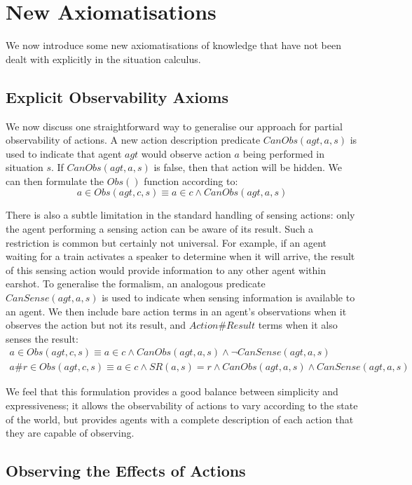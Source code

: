 \section{New Axiomatisations}

We now introduce some new axiomatisations of knowledge that have not
been dealt with explicitly in the situation calculus.


\subsection{Explicit Observability Axioms}

We now discuss one straightforward way to generalise our approach
for partial observability of actions. A new action description predicate
$CanObs(agt,a,s)$ is used to indicate that agent $agt$ would observe
action $a$ being performed in situation $s$. If $CanObs(agt,a,s)$
is false, then that action will be hidden. We can then formulate the
$Obs()$ function according to:\[
a\in Obs(agt,c,s)\equiv a\in c\wedge CanObs(agt,a,s)\]


There is also a subtle limitation in the standard handling of sensing
actions: only the agent performing a sensing action can be aware of
its result. Such a restriction is common but certainly not universal.
For example, if an agent waiting for a train activates a speaker to
determine when it will arrive, the result of this sensing action would
provide information to any other agent within earshot. To generalise
the formalism, an analogous predicate $CanSense(agt,a,s)$ is used
to indicate when sensing information is available to an agent. We
then include bare action terms in an agent's observations when it
observes the action but not its result, and \emph{$Action\#Result$}
terms when it also senses the result:\begin{gather*}
a\in Obs(agt,c,s)\equiv a\in c\wedge CanObs(agt,a,s)\wedge\neg CanSense(agt,a,s)\\
a\#r\in Obs(agt,c,s)\equiv a\in c\wedge SR(a,s)=r\wedge CanObs(agt,a,s)\wedge CanSense(agt,a,s)\end{gather*}


We feel that this formulation provides a good balance between simplicity
and expressiveness; it allows the observability of actions to vary
according to the state of the world, but provides agents with a complete
description of each action that they are capable of observing.


\subsection{Observing the Effects of Actions}


